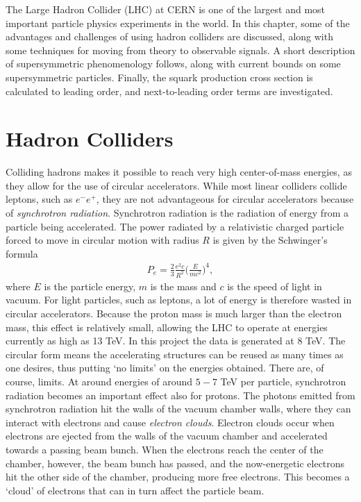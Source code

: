 \documentclass[twoside,english]{uiofysmaster}
\begin{document}
The Large Hadron Collider (LHC) at CERN is one of the largest and most important particle physics experiments in the world. In this chapter, some of the advantages and challenges of using hadron colliders are discussed, along with some techniques for moving from theory to observable signals. A short description of supersymmetric phenomenology follows, along with current bounds on some supersymmetric particles. Finally, the squark production cross section is calculated to leading order, and next-to-leading order terms are investigated.

\section{Hadron Colliders}

Colliding hadrons makes it possible to reach very high center-of-mass energies, as they allow for the use of circular accelerators. While most linear colliders collide leptons, such as $e^- e^+$, they are not advantageous for circular accelerators because of \textit{synchrotron radiation}. Synchrotron radiation is the radiation of energy from a particle being accelerated. The power radiated by a relativistic charged particle forced to move in circular motion with radius $R$ is given by the Schwinger's formula \cite{Balerna2015}
\begin{align}
P_e = \frac{2}{3} \frac{e^2c }{R^2} \Bigg( \frac{E}{mc^2} \Bigg)^4,
\end{align}
where $E$ is the particle energy, $m$ is the mass and $c$ is the speed of light in vacuum. For light particles, such as leptons, a lot of energy is therefore wasted in circular accelerators. Because the proton mass is much larger than the electron mass, this effect is relatively small, allowing the LHC to operate at energies currently as high as 13 TeV. In this project the data is generated at $8$ TeV. The circular form means the accelerating structures can be reused as many times as one desires, thus putting `no limits' on the energies obtained. There are, of course, limits. At around energies of around $5-7$ TeV per particle, synchrotron radiation becomes an important effect also for protons. The photons emitted from synchrotron radiation hit the walls of the vacuum chamber walls, where they can interact with electrons and cause \textit{electron clouds}. Electron clouds occur when electrons are ejected from the walls of the vacuum chamber and accelerated towards a passing beam bunch. When the electrons reach the center of the chamber, however, the beam bunch has passed, and the now-energetic electrons hit the other side of the chamber, producing more free electrons. This becomes a `cloud' of electrons that can in turn affect the particle beam. 
\end{document}
